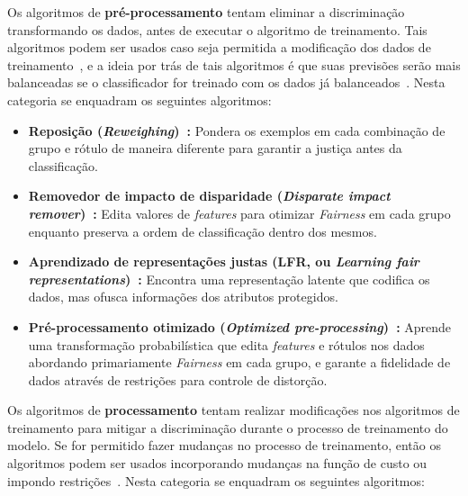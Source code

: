 \documentclass[Portugues,Final]{ic-tese-v3}
\begin{document}
Os algoritmos de \textbf{pré-processamento} tentam eliminar a discriminação transformando os dados, antes de executar o algoritmo de treinamento. Tais algoritmos podem ser usados caso seja permitida a modificação dos dados de treinamento~\cite{dAlessandro_2017}, e a ideia por trás de tais algoritmos é que suas previsões serão mais balanceadas se o classificador for treinado com os dados já balanceados~\cite{Kamiran_2009}. Nesta categoria se enquadram os seguintes algoritmos:

\begin{itemize}
\item \textbf{Reposição (\textit{Reweighing})~\cite{Kamiran_2011}:} Pondera os exemplos em cada combinação de grupo e rótulo de maneira diferente para garantir a justiça antes da classificação.

\item \textbf{Removedor de impacto de disparidade (\textit{Disparate impact remover})~\cite{Feldman_2015}:} Edita valores de \textit{features} para otimizar \textit{Fairness} em cada grupo enquanto preserva a ordem de classificação dentro dos mesmos.

\item \textbf{Aprendizado de representações justas (LFR, ou \textit{Learning fair representations})~\cite{Zemel_2013}:} Encontra uma representação latente que codifica os dados, mas ofusca informações dos atributos protegidos.

\item \textbf{Pré-processamento otimizado (\textit{Optimized pre-processing})~\cite{Calmon_2017}:} Aprende uma transformação probabilística que edita \textit{features} e rótulos nos dados abordando primariamente \textit{Fairness} em cada grupo, e garante a fidelidade de dados através de restrições para controle de distorção.
\end{itemize}

Os algoritmos de \textbf{processamento} tentam realizar modificações nos algoritmos de treinamento para mitigar a discriminação durante o processo de treinamento do modelo. Se for permitido fazer mudanças no processo de treinamento, então os algoritmos podem ser usados incorporando mudanças na função de custo ou impondo restrições~\cite{Mehrabi_2021}. Nesta categoria se enquadram os seguintes algoritmos:
\end{document}
